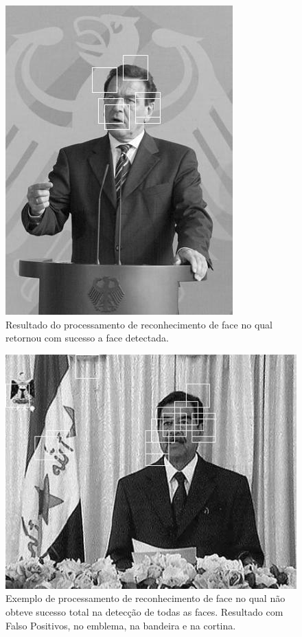 \documentclass[aspectratio=169, xcolor=dvipsnames]{beamer}
\begin{document}
	\begin{frame}
		\begin{figure}[h]
			\centering
			\includegraphics[width=0.6\linewidth]{img/detect_2.jpg}
			\caption{Resultado do processamento de reconhecimento de face no qual retornou com sucesso a face detectada.}
			\label{fig:detect_2}
		\end{figure}
	\end{frame}
	
	\begin{frame}
		\begin{figure}[h]
			\centering
			\includegraphics[width=0.57\linewidth]{img/detect_3.jpg}
			\caption{Exemplo de processamento de reconhecimento de face no qual não obteve sucesso total na detecção de todas as faces. Resultado com Falso Positivos, no emblema, na bandeira e na cortina.}
			\label{fig:detect_3}
		\end{figure}
	\end{frame}
	
\end{document}
